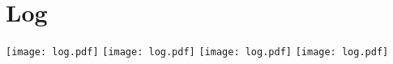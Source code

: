 \chapter{Log}
\label{"apx:log"}
\centering
\texttt{[image: log.pdf]}
\newpage
\texttt{[image: log.pdf]}
\newpage
\texttt{[image: log.pdf]}
\newpage
\texttt{[image: log.pdf]}